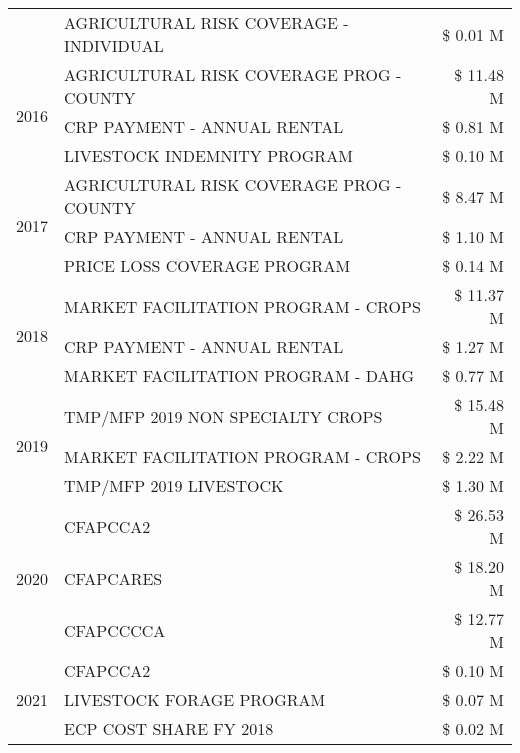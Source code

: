 \begin{tabular}{llr}
 & AGRICULTURAL RISK COVERAGE - INDIVIDUAL & \$ 0.01 M \\
\cline{1-3}
\multirow[t]{3}{*}{2016} & AGRICULTURAL RISK COVERAGE PROG - COUNTY & \$ 11.48 M \\
 & CRP PAYMENT - ANNUAL RENTAL & \$ 0.81 M \\
 & LIVESTOCK INDEMNITY PROGRAM & \$ 0.10 M \\
\cline{1-3}
\multirow[t]{3}{*}{2017} & AGRICULTURAL RISK COVERAGE PROG - COUNTY & \$ 8.47 M \\
 & CRP PAYMENT - ANNUAL RENTAL & \$ 1.10 M \\
 & PRICE LOSS COVERAGE PROGRAM & \$ 0.14 M \\
\cline{1-3}
\multirow[t]{3}{*}{2018} & MARKET FACILITATION PROGRAM - CROPS & \$ 11.37 M \\
 & CRP PAYMENT - ANNUAL RENTAL & \$ 1.27 M \\
 & MARKET FACILITATION PROGRAM - DAHG & \$ 0.77 M \\
\cline{1-3}
\multirow[t]{3}{*}{2019} & TMP/MFP 2019 NON SPECIALTY CROPS & \$ 15.48 M \\
 & MARKET FACILITATION PROGRAM - CROPS & \$ 2.22 M \\
 & TMP/MFP 2019 LIVESTOCK & \$ 1.30 M \\
\cline{1-3}
\multirow[t]{3}{*}{2020} & CFAPCCA2 & \$ 26.53 M \\
 & CFAPCARES & \$ 18.20 M \\
 & CFAPCCCCA & \$ 12.77 M \\
\cline{1-3}
\multirow[t]{3}{*}{2021} & CFAPCCA2 & \$ 0.10 M \\
 & LIVESTOCK FORAGE PROGRAM & \$ 0.07 M \\
 & ECP COST SHARE FY 2018 & \$ 0.02 M \\
\cline{1-3}
\bottomrule
\end{tabular}
